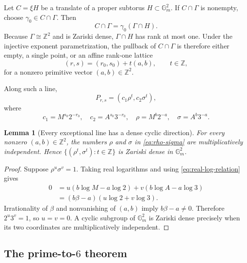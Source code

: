 \documentclass[11pt,oneside]{article}
\newtheorem{lemma}[theorem]{Lemma}
\theoremstyle{definition}
\newcommand{\Z}{\mathbb{Z}}
\newcommand{\Gm}{\mathbb{G}_{m}}
\begin{document}
Let $C=\xi H$ be a translate of a proper subtorus $H\subset\Gm^2$.  If
$C\cap\Gamma$ is nonempty, choose $\gamma_0\in C\cap\Gamma$.  Then
\begin{equation}\label{eq:coset-intersection}
  C\cap\Gamma=\gamma_0(\Gamma\cap H).
\end{equation}
Because $\Gamma\cong\Z^2$ and is Zariski dense, $\Gamma\cap H$ has rank at
most one.  Under the injective exponent parametrization, the pullback of
$C\cap\Gamma$ is therefore either empty, a single point, or an affine
rank-one lattice
\begin{equation}\label{eq:affine-line}
  (r,s)=(r_0,s_0)+t(a,b),
  \qquad t\in\Z,
\end{equation}
for a nonzero primitive vector $(a,b)\in\Z^2$.

Along such a line,
\begin{equation}\label{eq:cyclic-line}
  P_{r,s}=(c_1\rho^t,c_2\sigma^t),
\end{equation}
where
\begin{equation}\label{eq:rho-sigma}
  c_1=M^{s_0}2^{-r_0},\quad c_2=A^{s_0}3^{-r_0},\quad
  \rho=M^b2^{-a},\quad \sigma=A^b3^{-a}.
\end{equation}

\begin{lemma}[Every exceptional line has a dense cyclic direction]
\label{lem:cyclic-dense}
For every nonzero $(a,b)\in\Z^2$, the numbers $\rho$ and $\sigma$ in
\eqref{eq:rho-sigma} are multiplicatively independent.  Hence
$\{(\rho^t,\sigma^t):t\in\Z\}$ is Zariski dense in $\Gm^2$.
\end{lemma}

\begin{proof}
Suppose $\rho^u\sigma^v=1$.  Taking real logarithms and using
\eqref{eq:real-log-relation} gives
\begin{align*}
  0
  &=u(b\log M-a\log2)+v(b\log A-a\log3)\\
  &=(b\beta-a)(u\log2+v\log3).
\end{align*}
Irrationality of $\beta$ and nonvanishing of $(a,b)$ imply
$b\beta-a\ne0$.  Therefore $2^u3^v=1$, so $u=v=0$.  A cyclic subgroup of
$\Gm^2$ is Zariski dense precisely when its two coordinates are
multiplicatively independent.
\end{proof}

\subsection{The prime-to-$6$ theorem}
\end{document}
